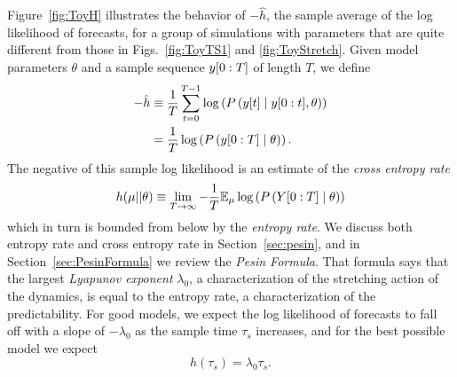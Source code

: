 Figure~\ref{fig:ToyH} illustrates the behavior of $-\hat h$, the sample
average of the log likelihood of forecasts, for a group of simulations
with parameters that are quite different from those in
Figs.~\ref{fig:ToyTS1} and \ref{fig:ToyStretch}.  Given model parameters
$\theta$ and a sample sequence $y[0:T]$ of length $T$, we define
\begin{align*}
  -\hat h &\equiv \frac{1}{T} \sum_{t=0}^{T-1}
    \log \left( P \left({y}{[t]}\mid y[0:t], \theta
      \right)\right)\\
    &=  \frac{1}{T} \log \left( P \left(y[0:T]\mid  \theta
      \right)\right).
\end{align*}
The negative of this sample log likelihood is an estimate of the
\emph{cross entropy rate} 
\begin{equation*}
  h(\mu||\theta) \equiv  \lim_{T \rightarrow \infty} - \frac{1}{T}
  \mathbb{E}_{\mu} \log \left( P \left(Y[0:T]\mid \theta \right) \right)
\end{equation*}
which in turn is bounded from below by the \emph{entropy rate}.  We
discuss both entropy rate and cross entropy rate in
Section~\ref{sec:pesin}, and in Section~\ref{sec:PesinFormula} we
review the \emph{Pesin Formula}.  That formula says that the largest
\emph{Lyapunov exponent} $\lambda_0$, a characterization of the
stretching action of the dynamics, is equal to the entropy rate, a
characterization of the predictability.  For good models, we expect
the log likelihood of forecasts to fall off with a slope of
$-\lambda_0$ as the sample time $\tau_s$ increases, and for the best
possible model we expect
\begin{equation}
  \label{eq:bound1}
  h(\tau_s) = \lambda_0 \tau_s.
\end{equation}

